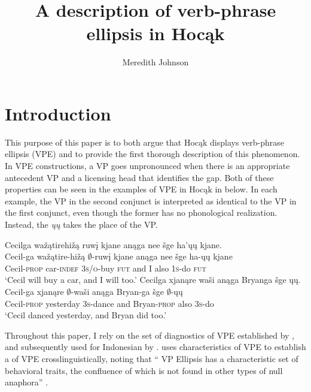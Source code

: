 \documentclass[output=paper]{LSP/langsci}
\author{Meredith Johnson}
\title{A description of verb-phrase ellipsis in {Hocąk}}
\begin{document}
\let\eachwordtwo=\itshape

\section{Introduction}\label{sec:johnson:1}

 
This purpose of this paper is to both argue that Hocąk displays verb-phrase ellipsis (VPE) and to provide the first thorough description of this phenomenon. In VPE constructions, a VP goes unpronounced when there is an appropriate antecedent VP and a licensing head that identifies the gap. Both of these properties can be seen in the examples of VPE in Hocąk in  below. In each example, the VP in the second conjunct is interpreted as identical to the VP in the first conjunct, even though the former has no phonological realization. Instead, the  \emph{ųų} takes the place of the VP.
 


\ea\label{ex:johnson:1}
\ea
\glll Cecilga {\ob}{\sVP} wažątirehižą ruwį{\cb} kjane anąga nee šge {\ob}ha'ųų{\cb} kjane.\\
Cecil-ga {} wažątire-hižą {$\emptyset$}-ruwį kjane anąga nee šge {\db}ha-ųų kjane\\
Cecil-\textsc{prop} {} car-\textsc{indef} \textsc{3s/o}-buy \textsc{fut} and I also {\db}\textsc{1s}-do \textsc{fut}\\
\trans `Cecil will buy a car, and I will too.' 
\ex
\glll Cecilga {\ob}{\sVP} xjanąre waši{\cb} anąga Bryanga šge {\ob}ųų{\cb}.\\
Cecil-ga {} xjanąre {$\emptyset$}-waši anąga Bryan-ga šge {\db}{$\emptyset$}-ųų\\
Cecil-\textsc{prop} {} yesterday \textsc{3s}-dance and Bryan-\textsc{prop} also {\db}\textsc{3s}-do\\
\trans `Cecil danced yesterday, and Bryan did too.'
\z
\z

Throughout this paper, I rely on the set of diagnostics of VPE established by \citet{Goldberg2005}, and subsequently used for Indonesian by \citet{Fortin2007}. \citet{Goldberg2005} uses characteristics of  VPE to establish a  of VPE crosslinguistically, noting that `` VP Ellipsis has a characteristic set of behavioral traits, the confluence of which is not found in other types of null anaphora'' \citep[27]{Goldberg2005}. 
\end{document}
